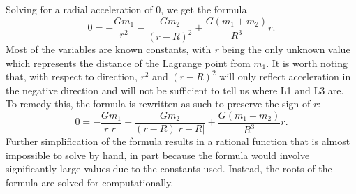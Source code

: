 \documentclass[12pt]{article}
\begin{document}
	Solving for a radial acceleration of 0, we get the formula
	\begin{equation*}
		0 = -\frac{Gm_1}{r^2} - \frac{Gm_2}{(r - R)^2} + \frac{G(m_1+m_2)}{R^3}r \text{.}
	\end{equation*}
	Most of the variables are known constants, with \textit{r} being the only unknown value which represents the distance of the Lagrange point from $m_1$.
	It is worth noting that, with respect to direction, $r^2$ and $(r-R)^2$ will only reflect acceleration in the negative direction and will not be sufficient to tell us where L1 and L3 are.
	To remedy this, the formula is rewritten as such to preserve the sign of $r$:
	\begin{equation*}
		0 = -\frac{Gm_1}{r|r|} - \frac{Gm_2}{(r - R)|r - R|} + \frac{G(m_1+m_2)}{R^3}r \text{.}
	\end{equation*}
	Further simplification of the formula results in a rational function that is almost impossible to solve by hand, in part because the formula would involve significantly large values due to the constants used.
	Instead, the roots of the formula are solved for computationally.
\end{document}
